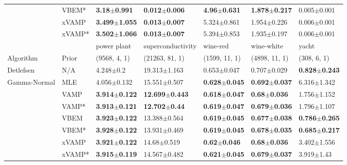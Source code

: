 \begin{tabular}{lllllll}
                 & VBEM* &   \textbf{3.18$\pm$0.991} &  \textbf{0.012$\pm$0.006} &   \textbf{4.96$\pm$0.631} &  \textbf{1.878$\pm$0.217} &         0.005$\pm$0.001 \\
                 & xVAMP &  \textbf{3.499$\pm$1.055} &  \textbf{0.013$\pm$0.007} &           5.324$\pm$0.861 &           1.954$\pm$0.226 &         0.006$\pm$0.001 \\
                 & xVAMP* &  \textbf{3.502$\pm$1.066} &  \textbf{0.013$\pm$0.007} &           5.394$\pm$0.853 &           1.935$\pm$0.197 &         0.006$\pm$0.001 \\
\midrule
                 &        &               power plant &          superconductivity &                  wine-red &                wine-white &                     yacht \\
Algorithm & Prior& (9568, 4, 1)& (21263, 81, 1)& (1599, 11, 1)& (4898, 11, 1)& (308, 6, 1)\\
\midrule
Detlefsen & N/A &             4.248$\pm$0.2 &           19.313$\pm$1.163 &           0.653$\pm$0.047 &           0.707$\pm$0.029 &  \textbf{0.828$\pm$0.243} \\
Gamma-Normal & MLE &           4.056$\pm$0.132 &           15.551$\pm$0.507 &  \textbf{0.628$\pm$0.045} &  \textbf{0.692$\pm$0.037} &           6.316$\pm$1.342 \\
                 & VAMP &  \textbf{3.914$\pm$0.122} &  \textbf{12.699$\pm$0.443} &  \textbf{0.618$\pm$0.047} &   \textbf{0.68$\pm$0.036} &           1.756$\pm$1.152 \\
                 & VAMP* &  \textbf{3.913$\pm$0.121} &   \textbf{12.702$\pm$0.44} &  \textbf{0.619$\pm$0.047} &  \textbf{0.679$\pm$0.036} &           1.796$\pm$1.107 \\
                 & VBEM &  \textbf{3.923$\pm$0.122} &           13.388$\pm$0.564 &  \textbf{0.619$\pm$0.045} &  \textbf{0.677$\pm$0.038} &  \textbf{0.786$\pm$0.265} \\
                 & VBEM* &  \textbf{3.928$\pm$0.122} &           13.931$\pm$0.469 &  \textbf{0.619$\pm$0.045} &  \textbf{0.678$\pm$0.035} &  \textbf{0.685$\pm$0.217} \\
                 & xVAMP &  \textbf{3.921$\pm$0.122} &            14.68$\pm$0.519 &   \textbf{0.62$\pm$0.046} &   \textbf{0.68$\pm$0.036} &           3.402$\pm$1.556 \\
                 & xVAMP* &  \textbf{3.915$\pm$0.119} &           14.567$\pm$0.482 &  \textbf{0.621$\pm$0.045} &  \textbf{0.679$\pm$0.037} &            3.919$\pm$1.43 \\

\end{tabular}
